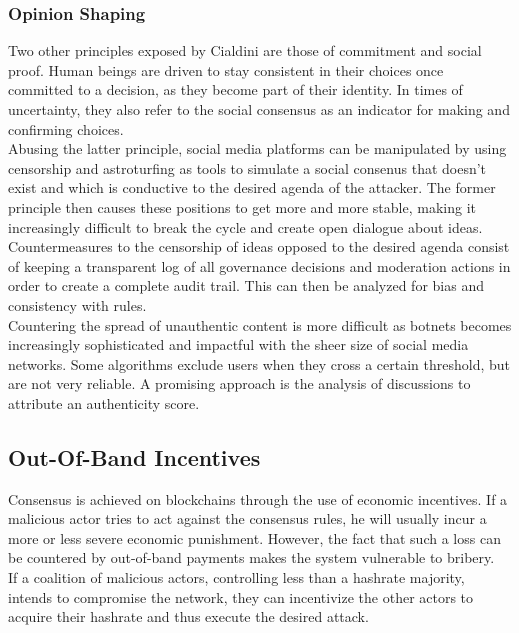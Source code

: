 \documentclass[12pt,a4paper]{article}
\begin{document}
\subsubsection{Opinion Shaping}

Two other principles exposed by Cialdini are those of commitment and social proof. Human beings are driven to stay consistent in their choices once committed to a decision, as they become part of their identity. In times of uncertainty, they also refer to the social consensus as an indicator for making and confirming choices.\\

Abusing the latter principle, social media platforms can be manipulated by using censorship and astroturfing \cite{astroturf} as tools to simulate a social consenus that doesn't exist and which is conductive to the desired agenda of the attacker. The former principle then causes these positions to get more and more stable, making it increasingly difficult to break the cycle and create open dialogue about ideas.\\

Countermeasures to the censorship of ideas opposed to the desired agenda consist of keeping a transparent log of all governance decisions and moderation actions in order to create a complete audit trail. This can then be analyzed for bias and consistency with rules.\\

Countering the spread of unauthentic content is more difficult as botnets becomes increasingly sophisticated and impactful with the sheer size of social media networks. Some algorithms exclude users when they cross a certain threshold, but are not very reliable. A promising approach is the analysis of discussions to attribute an authenticity score.\\

\subsection{Out-Of-Band Incentives}

Consensus is achieved on \gls{blockchain}s through the use of economic incentives. If a malicious actor tries to act against the consensus rules, he will usually incur a more or less severe economic punishment. However, the fact that such a loss can be countered by out-of-band payments makes the system vulnerable to bribery.\\

If a coalition of malicious actors, controlling less than a \gls{hashrate} majority, intends to compromise the network, they can incentivize the other actors to acquire their \gls{hashrate} and thus execute the desired attack.\\
\end{document}
